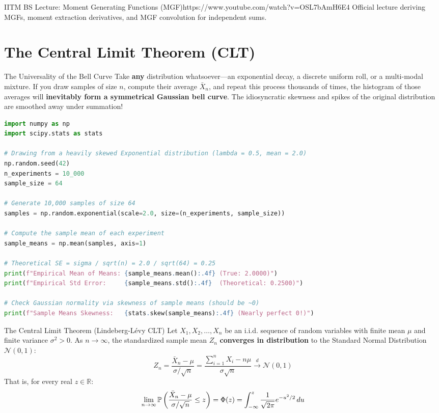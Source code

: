 \begin{videocard}{IITM BS Lecture: Moment Generating Functions (MGF)}{https://www.youtube.com/watch?v=OSL7bAmH6E4}
Official lecture deriving MGFs, moment extraction derivatives, and MGF convolution for independent sums.
\end{videocard}

\section{The Central Limit Theorem (CLT)}

\begin{intuitionbox}{The Universality of the Bell Curve}
Take \textbf{any} distribution whatsoever---an exponential decay, a discrete uniform roll, or a multi-modal mixture. If you draw samples of size $n$, compute their average $\bar{X}_n$, and repeat this process thousands of times, the histogram of those averages will \textbf{inevitably form a symmetrical Gaussian bell curve}. The idiosyncratic skewness and spikes of the original distribution are smoothed away under summation!
\end{intuitionbox}

\begin{lstlisting}[language=Python, caption=Data Science: Demonstrating the Central Limit Theorem]
import numpy as np
import scipy.stats as stats

# Drawing from a heavily skewed Exponential distribution (lambda = 0.5, mean = 2.0)
np.random.seed(42)
n_experiments = 10_000
sample_size = 64

# Generate 10,000 samples of size 64
samples = np.random.exponential(scale=2.0, size=(n_experiments, sample_size))

# Compute the sample mean of each experiment
sample_means = np.mean(samples, axis=1)

# Theoretical SE = sigma / sqrt(n) = 2.0 / sqrt(64) = 0.25
print(f"Empirical Mean of Means: {sample_means.mean():.4f} (True: 2.0000)")
print(f"Empirical Std Error:     {sample_means.std():.4f}  (Theoretical: 0.2500)")

# Check Gaussian normality via skewness of sample means (should be ~0)
print(f"Sample Means Skewness:   {stats.skew(sample_means):.4f} (Nearly perfect 0!)")
\end{lstlisting}

\begin{theorembox}{The Central Limit Theorem (Lindeberg-Lévy CLT)}
Let $X_1, X_2, \dots, X_n$ be an i.i.d. sequence of random variables with finite mean $\mu$ and finite variance $\sigma^2 > 0$.
As $n \to \infty$, the standardized sample mean $Z_n$ \textbf{converges in distribution} to the Standard Normal Distribution $\mathcal{N}(0, 1)$:
$$Z_n = \frac{\bar{X}_n - \mu}{\sigma / \sqrt{n}} = \frac{\sum_{i=1}^n X_i - n\mu}{\sigma \sqrt{n}} \xrightarrow{d} \mathcal{N}(0, 1)$$
That is, for every real $z \in \mathbb{R}$:
$$\lim_{n \to \infty} \P\left( \frac{\bar{X}_n - \mu}{\sigma / \sqrt{n}} \le z \right) = \Phi(z) = \int_{-\infty}^z \frac{1}{\sqrt{2\pi}} e^{-u^2/2} \, du$$
\end{theorembox}

